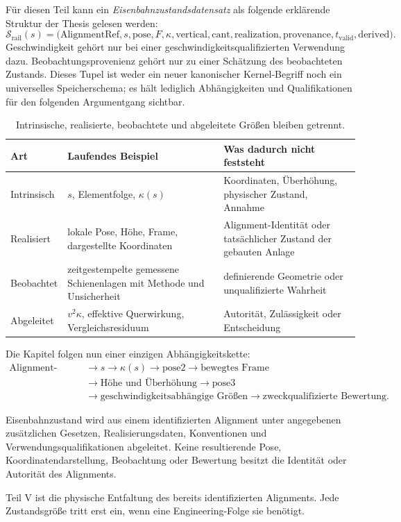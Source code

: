 Für diesen Teil kann ein \emph{Eisenbahnzustandsdatensatz} als folgende
erklärende Struktur der Thesis gelesen werden:
\[
\mathcal S_{\mathrm{rail}}(s)=
\bigl(
\mathrm{AlignmentRef},s,\mathrm{pose},F,\kappa,
\mathrm{vertical},\mathrm{cant},\mathrm{realization},
\mathrm{provenance},t_{\mathrm{valid}},\mathrm{derived}
\bigr).
\]
Geschwindigkeit gehört nur bei einer geschwindigkeitsqualifizierten Verwendung
dazu. Beobachtungsprovenienz gehört nur zu einer Schätzung des beobachteten
Zustands. Dieses Tupel ist weder ein neuer kanonischer Kernel-Begriff noch ein
universelles Speicherschema; es hält lediglich Abhängigkeiten und
Qualifikationen für den folgenden Argumentgang sichtbar.

\begin{table}[htbp]
\centering
\small
\begin{tabular}{p{}p{}p{}}
\toprule
\textbf{Art} & \textbf{Laufendes Beispiel} & \textbf{Was dadurch nicht feststeht}\\
\midrule
Intrinsisch & \(s\), Elementfolge, \(\kappa(s)\) & Koordinaten, Überhöhung, physischer Zustand, Annahme\\
Realisiert & lokale Pose, Höhe, Frame, dargestellte Koordinaten & Alignment-Identität oder tatsächlicher Zustand der gebauten Anlage\\
Beobachtet & zeitgestempelte gemessene Schienenlagen mit Methode und Unsicherheit & definierende Geometrie oder unqualifizierte Wahrheit\\
Abgeleitet & \(v^2\kappa\), effektive Querwirkung, Vergleichsresiduum & Autorität, Zulässigkeit oder Entscheidung\\
\bottomrule
\end{tabular}
\caption{Intrinsische, realisierte, beobachtete und abgeleitete Größen bleiben getrennt.}
\label{tab:railway-state-kinds}
\end{table}

Die Kapitel folgen nun einer einzigen Abhängigkeitskette:
\begin{align*}
\text{Alignment-Identität}&\rightarrow s\rightarrow\kappa(s)
\rightarrow\mathrm{pose2}\rightarrow\text{bewegtes Frame}\\
&\rightarrow\text{Höhe und Überhöhung}
\rightarrow\mathrm{pose3}\\
&\rightarrow\text{geschwindigkeitsabhängige Größen}
\rightarrow\text{zweckqualifizierte Bewertung}.
\end{align*}

\begin{principle}[Eisenbahnzustandsprinzip]
\label{princ:railway-state}
Eisenbahnzustand wird aus einem identifizierten Alignment unter angegebenen
zusätzlichen Gesetzen, Realisierungsdaten, Konventionen und
Verwendungsqualifikationen abgeleitet. Keine resultierende Pose,
Koordinatendarstellung, Beobachtung oder Bewertung besitzt die Identität oder
Autorität des Alignments.
\end{principle}

\begin{summary}
Teil V ist die physische Entfaltung des bereits identifizierten Alignments.
Jede Zustandsgröße tritt erst ein, wenn eine Engineering-Folge sie benötigt.
\end{summary}
